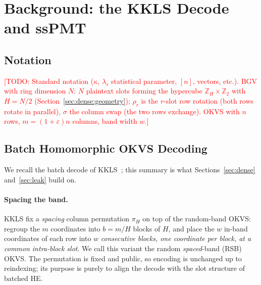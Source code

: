 \documentclass[runningheads]{llncs}
\newcommand{\TODO}[1]{\textcolor{red}{[TODO: #1]}}
\newcommand{\Z}{\mathbb{Z}}
\newcommand{\rr}{\rho}                       %
\newcommand{\colswap}{\sigma}                %
\newcommand{\band}{w}                        %
\newcommand{\eps}{\varepsilon}               %
\newcommand{\half}{H}                        %
\begin{document}
\section{Background: the KKLS Decode and ssPMT}
\label{sec:prelim}

\subsection{Notation}
\label{sec:prelim:notation}
\TODO{Standard notation ($\kappa$, $\lambda_s$ statistical parameter, $[n]$, vectors,
etc.). BGV with ring dimension $N$: $N$ plaintext slots forming the hypercube
$\Z_{\half}\times\Z_2$ with $\half=N/2$ (Section~\ref{sec:dense:geometry});
$\rr_r$ is the $r$-slot row rotation (both rows rotate in parallel), $\colswap$
the column swap (the two rows exchange). OKVS with $n$ rows, $m=(1+\eps)n$
columns, band width $\band$.}

\subsection{Batch Homomorphic OKVS Decoding}
\label{sec:prelim:homdec}

We recall the batch decode of KKLS~\cite{EPRINT:KwaKwoLeeSon26}; this summary is what
Sections~\ref{sec:dense} and~\ref{sec:leak} build on.

\paragraph{Spacing the band.}
KKLS fix a \emph{spacing} column permutation $\pi_\half$ on top of the random-band OKVS:
regroup the $m$ coordinates into $b=m/\half$ blocks of $\half$, and place the $\band$
in-band coordinates of each row into $\band$ \emph{consecutive blocks, one coordinate
per block, at a common intra-block slot}. We call this variant the random
\emph{spaced}-band (RSB) OKVS. The permutation is fixed and public, so encoding is
unchanged up to reindexing; its purpose is purely to align the decode with the slot
structure of batched HE.
\end{document}
